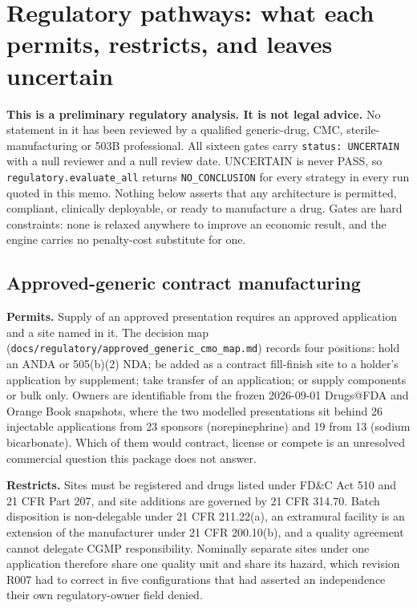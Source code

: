 \section{Regulatory pathways: what each permits, restricts, and leaves uncertain}
\label{sec:regulatory}

\textbf{This is a preliminary regulatory analysis. It is not legal advice.} No statement in it
has been reviewed by a qualified generic-drug, CMC, sterile-manufacturing or 503B professional.
All sixteen gates carry \texttt{status: UNCERTAIN} with a null reviewer and a null review date.
UNCERTAIN is never PASS, so \texttt{regulatory.evaluate\_all} returns \texttt{NO\_CONCLUSION} for
every strategy in every run quoted in this memo. Nothing below asserts that any architecture is
permitted, compliant, clinically deployable, or ready to manufacture a drug. Gates are hard
constraints: none is relaxed anywhere to improve an economic result, and the engine carries no
penalty-cost substitute for one.

\subsection{Approved-generic contract manufacturing}

\textbf{Permits.} Supply of an approved presentation requires an approved application and a site
named in it. The decision map (\texttt{docs/regulatory/approved\_generic\_cmo\_map.md}) records
four positions: hold an ANDA or 505(b)(2) NDA; be added as a contract fill-finish site to a
holder's application by supplement; take transfer of an application; or supply components or bulk
only. Owners are identifiable from the frozen 2026-09-01 Drugs@FDA and Orange Book snapshots,
where the two modelled presentations sit behind 26 injectable applications from 23 sponsors
(norepinephrine) and 19 from 13 (sodium bicarbonate). Which of them would contract, license or
compete is an unresolved commercial question this package does not answer.

\textbf{Restricts.} Sites must be registered and drugs listed under FD\&C Act 510 and 21 CFR Part
207, and site additions are governed by 21 CFR 314.70. Batch disposition is non-delegable under
21 CFR 211.22(a), an extramural facility is an extension of the manufacturer under 21 CFR
200.10(b), and a quality agreement cannot delegate CGMP responsibility. Nominally separate sites
under one application therefore share one quality unit and share its hazard, which revision R007
had to correct in five configurations that had asserted an independence their own
regulatory-owner field denied.

